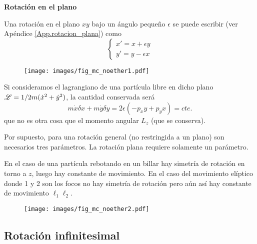 \documentclass[10pt,oneside]{CBFT_book}
\begin{document}
\begin{ejemplo}{\bfseries Rotación en el plano }

Una rotación en el plano $xy$ bajo un ángulo pequeño $\epsilon$ se puede escribir (ver Apéndice 
\ref{App.rotacion_plana}) como 
\[
 \begin{cases}
  x' = x + \epsilon y \\
  y' = y - \epsilon x
 \end{cases}
\]
\begin{figure}[!htb]
	\begin{center}
	\texttt{[image: images/fig\_mc\_noether1.pdf]}	 
	\end{center}
	\caption{}
	\label{fig_mc_noether1}
\end{figure} 

Si consideramos el lagrangiano de una partícula libre en dicho plano $ \mathscr{L} = 1/2 m (\dot{x}^2 + \dot{y}^2)$, la 
cantidad conservada será 
\[
	m \dot{x} \delta x + m \dot{y} \delta y = 2\epsilon ( -p_x y + p_y x ) = cte.
\]
que no es otra cosa que el momento angular $L_z$ (que se conserva).

Por supuesto, para una rotación general (no restringida a un plano) son necesarios tres parámetros.
La rotación plana requiere solamente un parámetro.
\end{ejemplo}


En el caso de una partícula rebotando en un billar hay simetría de rotación en torno a $z$, luego hay
constante de movimiento. En el caso del movimiento elíptico donde 1 y 2 son los focos no hay simetría
de rotación pero aún así hay constante de movimiento $ \ell_1 \ell_2 $.

\begin{figure}[!htb]
	\begin{center}
	\texttt{[image: images/fig\_mc\_noether2.pdf]}	 
	\end{center}
	\caption{}
	\label{fig_mc_noether2}
\end{figure} 

\subsection{Rotación infinitesimal}

\end{document}
